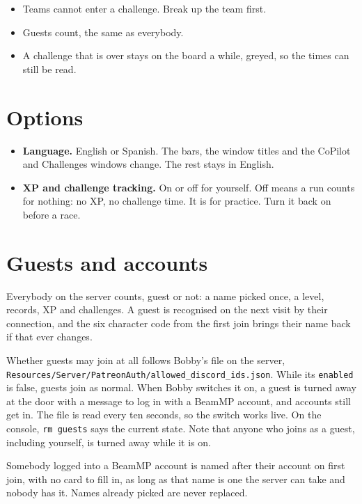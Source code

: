 \documentclass[11pt,a4paper]{article}
\newcommand{\code}[1]{\texttt{\small #1}}
\begin{document}
\begin{itemize}
  \item Teams cannot enter a challenge. Break up the team first.
  \item Guests count, the same as everybody.
  \item A challenge that is over stays on the board a while, greyed, so
        the times can still be read.
\end{itemize}

\section{Options}

\begin{itemize}
  \item \textbf{Language.} English or Spanish. The bars, the window titles
        and the CoPilot and Challenges windows change. The rest stays in
        English.
  \item \textbf{XP and challenge tracking.} On or off for yourself. Off
        means a run counts for nothing: no XP, no challenge time. It is
        for practice. Turn it back on before a race.
\end{itemize}

\section{Guests and accounts}

Everybody on the server counts, guest or not: a name picked once, a level,
records, XP and challenges. A guest is recognised on the next visit by
their connection, and the six character code from the first join brings
their name back if that ever changes.

Whether guests may join at all follows Bobby's file on the server,
\code{Resources/Server/PatreonAuth/allowed\_discord\_ids.json}. While its
\code{enabled} is false, guests join as normal. When Bobby switches it on,
a guest is turned away at the door with a message to log in with a BeamMP
account, and accounts still get in. The file is read every ten seconds,
so the switch works live. On the console, \code{rm guests} says the
current state. Note that anyone who joins as a guest, including yourself,
is turned away while it is on.

Somebody logged into a BeamMP account is named after their account on
first join, with no card to fill in, as long as that name is one the
server can take and nobody has it. Names already picked are never
replaced.
\end{document}
